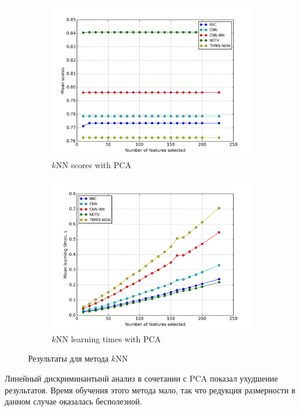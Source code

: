 \begin{figure}[h!]
    \centering
	\begin{subfigure}{0.45\textwidth}
		\includegraphics[width=\textwidth]{images/PCA-kNN.png}
		\caption{\(k\)NN scores with PCA}
	\end{subfigure}
	\begin{subfigure}{0.45\textwidth}
		\includegraphics[width=\textwidth]{images/PCA-kNNTime.png}
		\caption{\(k\)NN learning times with PCA}
	\end{subfigure}
	\caption{Результаты для метода \(k\)NN}\label{fig:knn_pca}
\end{figure}

\par
Линейный дискриминантынй анализ в сочетании с PCA показал ухудшение результатов. Время обучения этого метода мало, так что редукция размерности в данном случае оказалась бесполезной.

